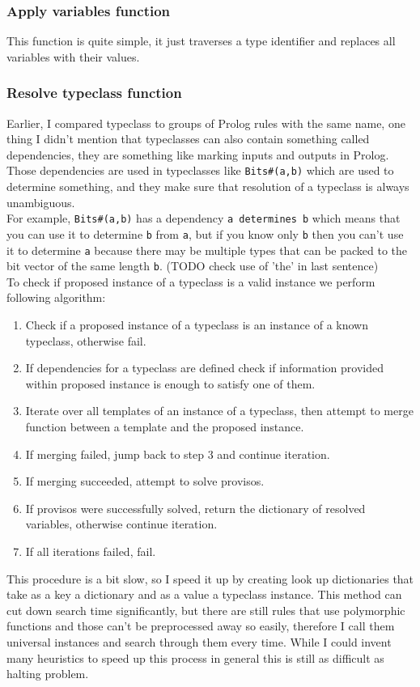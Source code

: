 \documentclass[14pt]{report}
\begin{document}
\subsubsection{Apply variables function}
This function is quite simple, it just traverses a type identifier and replaces all variables with their values.
\subsubsection{Resolve typeclass function}
Earlier, I compared typeclass to groups of Prolog rules with the same name, one thing I didn't mention that typeclasses can also contain something called dependencies, they are something like marking inputs and outputs in Prolog. Those dependencies are used in typeclasses like \verb!Bits#(a,b)! which are used to determine something, and they make sure that resolution of a typeclass is always unambiguous. \\
For example, \verb!Bits#(a,b)! has a dependency \verb!a determines b! which means that you can use it to determine \verb!b! from \verb!a!, but if you know only \verb!b! then you can't use it to determine \verb!a! because there may be multiple types that can be packed to the bit vector of the same length \verb!b!. (TODO check use of 'the' in last sentence)
\\  
To check if proposed instance of a typeclass is a valid instance we perform following algorithm:
\begin{enumerate}
    \item Check if a proposed instance of a typeclass is an instance of a known typeclass, otherwise fail.
    \item If dependencies for a typeclass are defined check if information provided within proposed instance is enough to satisfy one of them.
    \item Iterate over all templates of an instance of a typeclass, then attempt to merge function between a template and the proposed instance. 
    \item If merging failed, jump back to step 3 and continue iteration.
    \item If merging succeeded, attempt to solve provisos.
    \item If provisos were successfully solved, return the dictionary of resolved variables, otherwise continue iteration.
    \item If all iterations failed, fail.
\end{enumerate}
This procedure is a bit slow, so I speed it up by creating look up dictionaries that take as a key a dictionary and as a value a typeclass instance. This method can cut down search time significantly, but there are still rules that use polymorphic functions and those can't be preprocessed away so easily, therefore I call them universal instances and search through them every time. While I could invent many heuristics to speed up this process in general this is still as difficult as halting problem.
\end{document}
